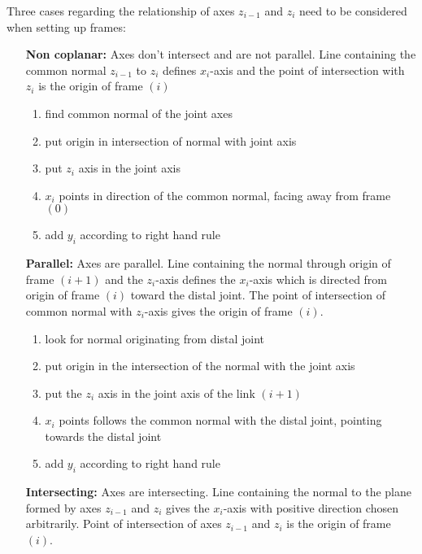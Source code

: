 Three cases regarding the relationship of axes $z_{i-1}$ and $z_i$  need to be considered when setting up frames:
\begin{itemize}[wide=\parindent] %
	\item[\textbf{Non coplanar:}] Axes don't intersect and are not parallel. Line containing the common normal $z_{i-1}$ to $z_i$ defines $x_i$-axis and the point of intersection with $z_i$ is the origin of frame $(i)$
	\begin{enumerate}[label=\emph{\alph*)}]
		\item find common normal of the joint axes
		\item put origin in intersection of normal with joint axis
		\item put $z_i$ axis in the joint axis
		\item $x_i$ points in direction of the common normal, facing away from frame $(0)$
		\item add $y_i$ according to right hand rule
	\end{enumerate}
	\item[\textbf{Parallel:}] Axes are parallel. Line containing the normal through origin of frame $(i+1)$ and the $z_i$-axis defines the $x_i$-axis which is directed from origin of frame $(i)$ toward the distal joint. The point of intersection of common normal with $z_i$-axis gives the origin of frame $(i)$. %
		\begin{enumerate}[label=\emph{\alph*)}]
		\item look for normal originating from distal joint
		\item put origin in the intersection of the normal with the joint axis
		\item put the $z_i$ axis in the joint axis of the link $(i+1)$ 
		\item $x_i$ points follows the common normal with the distal joint, pointing towards the distal joint
		\item add $y_i$ according to right hand rule
	\end{enumerate}
	\item[\textbf{Intersecting:}] Axes are intersecting. Line containing the normal to the plane formed by axes $z_{i-1}$ and  $z_i$ gives the $x_i$-axis with positive direction chosen arbitrarily. Point of intersection of  axes $z_{i-1}$  and  $z_i$ is the origin of frame $(i)$.

\end{itemize}
